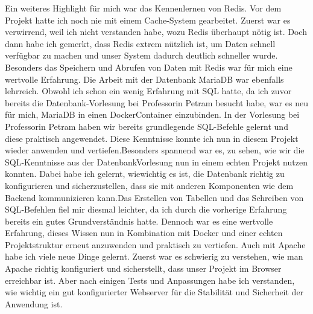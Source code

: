 Ein weiteres Highlight für mich war das Kennenlernen von Redis. Vor dem Projekt hatte ich noch nie mit einem Cache-System gearbeitet. Zuerst war es verwirrend, weil ich nicht verstanden habe, wozu Redis überhaupt nötig ist. Doch dann habe ich gemerkt, dass Redis extrem nützlich ist, um Daten schnell verfügbar zu machen und unser System dadurch deutlich schneller wurde. Besonders das Speichern und Abrufen von Daten mit Redis war für mich eine wertvolle Erfahrung. Die Arbeit mit der Datenbank MariaDB war ebenfalls lehrreich. Obwohl ich schon ein wenig Erfahrung mit SQL hatte, da ich zuvor bereits die Datenbank-Vorlesung bei Professorin Petram besucht habe, war es neu für mich, MariaDB in einen DockerContainer einzubinden. In der Vorlesung bei Professorin Petram haben wir bereits grundlegende SQL-Befehle gelernt und diese praktisch angewendet. Diese Kenntnisse konnte ich nun in diesem Projekt wieder anwenden und vertiefen.Besonders spannend war es, zu sehen, wie wir die SQL-Kenntnisse aus der DatenbankVorlesung nun in einem echten Projekt nutzen konnten. Dabei habe ich gelernt, wiewichtig es ist, die Datenbank richtig zu konfigurieren und sicherzustellen, dass sie mit anderen Komponenten wie dem Backend kommunizieren kann.Das Erstellen von Tabellen und das Schreiben von SQL-Befehlen fiel mir diesmal leichter, da ich durch die vorherige Erfahrung bereits ein gutes Grundverständnis hatte. Dennoch war es eine wertvolle Erfahrung, dieses Wissen nun in Kombination mit Docker und einer echten Projektstruktur erneut anzuwenden und praktisch zu vertiefen. Auch mit Apache habe ich viele neue Dinge gelernt. Zuerst war es schwierig zu verstehen, wie man Apache richtig konfiguriert und sicherstellt, dass unser Projekt im Browser erreichbar ist. Aber nach einigen Tests und Anpassungen habe ich verstanden, wie wichtig ein gut konfigurierter Webserver für die Stabilität und Sicherheit der Anwendung ist.

